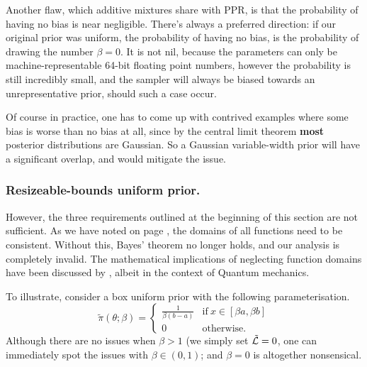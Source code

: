 \documentclass[usenatbib]{mnras}
\begin{document}
Another flaw, which additive mixtures share with PPR, is that the
probability of having no bias is near negligible. There's always a
preferred direction: if our original prior was  uniform, the
probability of having no bias, is the probability of drawing the
number \(\beta=0\). It is not nil, because the parameters can only
be machine-representable 64-bit floating point numbers, however
the probability is still incredibly small, and the sampler will
always be biased towards an unrepresentative prior, should such a
case occur.

Of course in practice, one has to come up with contrived examples
where some bias is worse than no bias at all, since by the central
limit theorem \textbf{most} posterior distributions are Gaussian. So a
Gaussian variable-width prior will have a significant overlap, and
would mitigate the issue.

\subsubsection{Resizeable-bounds uniform prior.}
\label{sec:org0e04538}

However, the three requirements outlined at the beginning of this
section are not sufficient. As we have noted on 
page \pageref{domain-discussion}, the domains of all functions need to be
consistent. Without this, Bayes' theorem no longer holds, and our
analysis is completely invalid. The mathematical implications of
neglecting function domains have been discussed by
\cite{Gieres_2000}, albeit in the context of Quantum mechanics.  

To illustrate, consider a box uniform prior
with the following parameterisation.
\begin{equation}
  \tilde{\pi}(\theta; \beta) =
  \begin{cases}
	\frac{1}{\beta(b-a)} & \text{if}\ x \in [\beta a, \beta b] \\
	0 & \text{otherwise}.
  \end{cases}
\end{equation}
Although there are no issues when \(\beta>1\) (we simply set \({\cal
	\tilde{L}}=0\), one can immediately spot the issues with \(\beta \in (0,1)\);
and \(\beta=0\) is altogether nonsensical.

\end{document}
